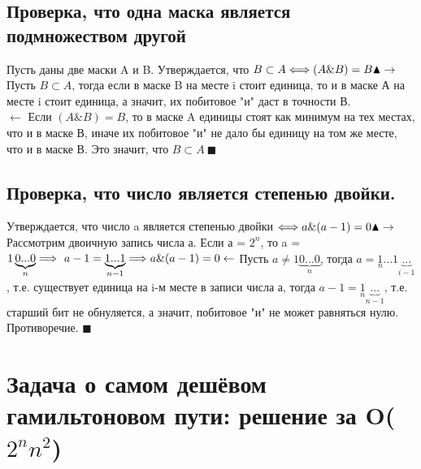 \subsection*{Проверка, что одна маска является подмножеством другой}
Пусть даны две маски A и B. Утверждается, что $B \subset A \Longleftrightarrow (A \& B) = B \\ \blacktriangle \\ \rightarrow$ Пусть $B \subset A$, тогда если в маске B на месте i стоит единица, то и в маске А на месте i стоит единица, а значит, их побитовое "и" даст в точности В. \\$\leftarrow$ Если $(A \& B) = B$, то в маске A единицы стоят как минимум на тех местах, что и в маске В, иначе их побитовое "и" не дало бы единицу на том же месте, что и в маске В. Это значит, что $B \subset A \ \blacksquare $ 

\subsection*{Проверка, что число является степенью двойки.}
Утверждается, что число a является степенью двойки $\Longleftrightarrow a \& (a-1) = 0 \\ \blacktriangle \\ \rightarrow$ Рассмотрим двоичную запись числа а. Если а = $2^n$, то a = $1\underbrace{0...0}_{n} \Longrightarrow \ a - 1 = \underbrace{1...1}_{n-1} \Longrightarrow a \&(a-1) = 0 \\ \leftarrow$ Пусть $a \neq 1\underbrace{0...0}_{n}$, тогда $a = \underset{n}{1} ...1\underbrace{...}_{i-1}$, т.е. существует единица на i-м месте в записи числа а, тогда $a - 1 = \underset{n}{1} \underbrace{...}_{n-1}$, т.е. старший бит не обнуляется, а значит, побитовое "и" не может равняться нулю. Противоречие. $\blacksquare$
\setcounter{section}{18}
\section{Задача о самом дешёвом гамильтоновом пути: решение за O($2^n n^2$)}

